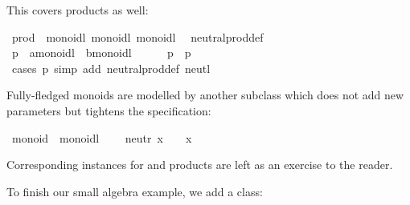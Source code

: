 \begin{isabellebody}
\begin{isamarkuptext}
This covers products as well:%
\end{isamarkuptext}%
\isamarkuptrue%
\isamarkupfalse%
\ prod\ {\isacharcolon}{\isacharcolon}\ {\isacharparenleft}monoidl{\isacharcomma}\ monoidl{\isacharparenright}\ monoidl\isanewline
{}\isanewline
\isanewline
{}\isamarkupfalse%
\isanewline
\ \ neutral{\isacharunderscore}prod{\isacharunderscore}def{\isacharcolon}\ {\isachardoublequoteopen}{\isasymzero}\ {\isacharequal}\ {\isacharparenleft}{\isasymzero}{\isacharcomma}\ {\isasymzero}{\isacharparenright}{\isachardoublequoteclose}\isanewline
\isanewline
{}\isamarkupfalse%
%
\isadelimproof
\ %
\endisadelimproof
%
\isatagproof
{}\isamarkupfalse%
\isanewline
\ \ \isamarkupfalse%
\ p\ {\isacharcolon}{\isacharcolon}\ {\isachardoublequoteopen}{\isacharprime}a{\isasymColon}monoidl\ {\isasymtimes}\ {\isacharprime}b{\isasymColon}monoidl{\isachardoublequoteclose}\isanewline
\ \ \isamarkupfalse%
\ {\isachardoublequoteopen}{\isasymzero}\ {\isasymoplus}\ p\ {\isacharequal}\ p{\isachardoublequoteclose}\isanewline
\ \ \ \ \isamarkupfalse%
\ {\isacharparenleft}cases\ p{\isacharparenright}\ {\isacharparenleft}simp\ add{\isacharcolon}\ neutral{\isacharunderscore}prod{\isacharunderscore}def\ neutl{\isacharparenright}\isanewline
{}\isamarkupfalse%
%
\endisatagproof
{\isafoldproof}%
%
\isadelimproof
%
\endisadelimproof
\isanewline
\isanewline
{}\isamarkupfalse%
%
\begin{isamarkuptext}%
\noindent Fully-fledged monoids are modelled by another
subclass which does not add new parameters but tightens the
specification:%
\end{isamarkuptext}%
\isamarkuptrue%
\isamarkupfalse%
\ monoid\ {\isacharequal}\ monoidl\ {\isacharplus}\isanewline
\ \ \ neutr{\isacharcolon}\ {\isachardoublequoteopen}x\ {\isasymoplus}\ {\isasymzero}\ {\isacharequal}\ x{\isachardoublequoteclose}%
\begin{isamarkuptext}%
\noindent Corresponding instances for  and products
are left as an exercise to the reader.%
\end{isamarkuptext}%
\isamarkuptrue%
%
\isamarkuptrue%
%
\begin{isamarkuptext}%
\noindent To finish our small algebra example, we add a  class:%
\end{isamarkuptext}%
\isamarkuptrue%
\isamarkupfalse%

\end{isabellebody}
